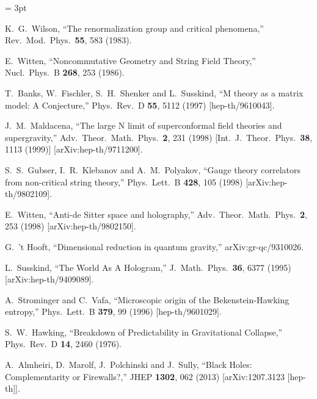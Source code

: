 \documentclass[12pt]{article}
\begin{document}
\begin{thebibliography}{99}
\itemsep = 3pt

  K.~G.~Wilson,
  ``The renormalization group and critical phenomena,''
  Rev.\ Mod.\ Phys.\  {\bf 55}, 583 (1983).
  
  E.~Witten,
  ``Noncommutative Geometry and String Field Theory,''
  Nucl.\ Phys.\ B {\bf 268}, 253 (1986).
  
  T.~Banks, W.~Fischler, S.~H.~Shenker and L.~Susskind,
  ``M theory as a matrix model: A Conjecture,''
  Phys.\ Rev.\ D {\bf 55}, 5112 (1997)
  [hep-th/9610043].

  J.~M.~Maldacena,
  ``The large N limit of superconformal field theories and supergravity,''
  Adv.\ Theor.\ Math.\ Phys.\  {\bf 2}, 231 (1998)
  [Int.\ J.\ Theor.\ Phys.\  {\bf 38}, 1113 (1999)]
  [arXiv:hep-th/9711200].

  S.~S.~Gubser, I.~R.~Klebanov and A.~M.~Polyakov,
  ``Gauge theory correlators from non-critical string theory,''
  Phys.\ Lett.\  B {\bf 428}, 105 (1998)
  [arXiv:hep-th/9802109].

  E.~Witten,
  ``Anti-de Sitter space and holography,''
  Adv.\ Theor.\ Math.\ Phys.\  {\bf 2}, 253 (1998)
  [arXiv:hep-th/9802150].
  
  G.~'t Hooft,
  ``Dimensional reduction in quantum gravity,''
  arXiv:gr-qc/9310026.

  L.~Susskind,
  ``The World As A Hologram,''
  J.\ Math.\ Phys.\  {\bf 36}, 6377 (1995)
  [arXiv:hep-th/9409089].
  
  A.~Strominger and C.~Vafa,
  ``Microscopic origin of the Bekenstein-Hawking entropy,''
  Phys.\ Lett.\ B {\bf 379}, 99 (1996)
  [hep-th/9601029].
  
  S.~W.~Hawking,
  ``Breakdown of Predictability in Gravitational Collapse,''
  Phys.\ Rev.\ D {\bf 14}, 2460 (1976).

  A.~Almheiri, D.~Marolf, J.~Polchinski and J.~Sully,
  ``Black Holes: Complementarity or Firewalls?,''
  JHEP {\bf 1302}, 062 (2013)
  [arXiv:1207.3123 [hep-th]].


\end{thebibliography}
\end{document}

